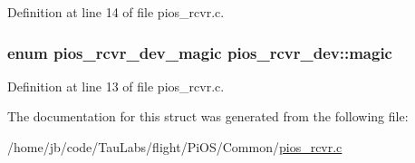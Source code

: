 \-Definition at line 14 of file pios\-\_\-rcvr.\-c.

\hypertarget{structpios__rcvr__dev_aa167293d3d19f1030cc61a2fc386eb66}{
\subsubsection[{magic}]{\setlength{\rightskip}{0pt plus 5cm}enum {\bf pios\-\_\-rcvr\-\_\-dev\-\_\-magic} {\bf pios\-\_\-rcvr\-\_\-dev\-::magic}}}\label{structpios__rcvr__dev_aa167293d3d19f1030cc61a2fc386eb66}


\-Definition at line 13 of file pios\-\_\-rcvr.\-c.



\-The documentation for this struct was generated from the following file\-:\begin{DoxyCompactItemize}
\item 
/home/jb/code/\-Tau\-Labs/flight/\-Pi\-O\-S/\-Common/\hyperlink{pios__rcvr_8c}{pios\-\_\-rcvr.\-c}\end{DoxyCompactItemize}
